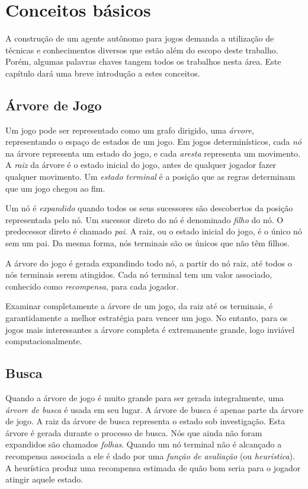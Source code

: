 \chapter{Conceitos básicos}
\label{concepts}
A construção de um agente autônomo para jogos demanda a utilização de técnicas e conhecimentos diversos que estão além do escopo deste trabalho. Porém, algumas palavras chaves tangem todos os trabalhos nesta área. Este capítulo dará uma breve introdução a estes conceitos.

\section{Árvore de Jogo}
Um jogo pode ser representado como um grafo dirigido, uma \textit{árvore}, representando o espaço de estados de um jogo. Em jogos determinísticos, cada \textit{nó} na árvore representa um estado do jogo, e cada \textit{aresta} representa um movimento. A \textit{raiz} da árvore é o estado inicial do jogo, antes de qualquer jogador fazer qualquer movimento. Um \textit{estado terminal} é a posição que as regras determinam que um jogo chegou ao fim. 

Um nó é \textit{expandido} quando todos os seus sucessores são descobertos da posição representada pelo nó. Um sucessor direto do nó é denominado \textit{filho} do nó. O predecessor direto é chamado \textit{pai}. A raiz, ou o estado inicial do jogo, é o único nó sem um pai. Da mesma forma, nós terminais são os únicos que não têm filhos.

A árvore do jogo é gerada expandindo todo nó, a partir do nó raiz, até todos o nós terminais serem atingidos. Cada nó terminal tem um valor associado, conhecido como \textit{recompensa}, para cada jogador. 

Examinar completamente a árvore de um jogo, da raiz até os terminais, é garantidamente a melhor estratégia para vencer um jogo. No entanto, para os jogos mais interessantes a árvore completa é extremanente grande, logo inviável computacionalmente. 

\section{Busca}
Quando a árvore de jogo é muito grande para ser gerada integralmente, uma \textit{árvore de busca} é usada em seu lugar. A árvore de busca é apenas parte da árvore de jogo. A raiz da árvore de busca representa o estado sob investigação. Esta árvore é gerada durante o processo de busca. Nós que ainda não foram expandidos são chamados \textit{folhas}. Quando um nó terminal não é alcançado a recompensa associada a ele é dado por uma \textit{função de avaliação} (ou \textit{heurística}). A heurística produz uma recompensa estimada de quão bom seria para o jogador atingir aquele estado.